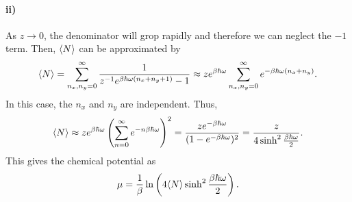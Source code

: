             \paragraph{ii)} As $z\to0$, the denominator will grop rapidly and therefore we can neglect the $-1$ term. Then, $\langle N \rangle$ can be approximated by
            \begin{equation}
                \langle N \rangle = \sum_{n_x,n_y=0}^{\infty}\frac{1}{z^{-1}e^{\beta\hbar\omega(n_x+n_y+1)}-1}\approx ze^{\beta\hbar\omega}\sum_{n_x,n_y=0}^{\infty}e^{-\beta\hbar\omega(n_x+n_y)}.
            \end{equation}
            In this case, the $n_x$ and $n_y$ are independent. Thus,
            \begin{equation}
                \langle N \rangle \approx ze^{\beta\hbar\omega}\left( \sum_{n=0}^{\infty}e^{-n\beta\hbar\omega} \right)^2=\frac{ze^{-\beta\hbar\omega}}{(1-e^{-\beta\hbar\omega})^2}=\frac{z}{4\sinh^2\frac{\beta\hbar\omega}{2}}.
            \end{equation}
            This gives the chemical potential as
            \begin{equation}
                \mu = \frac{1}{\beta}\ln\left( 4\langle N \rangle\sinh^2\frac{\beta\hbar\omega}{2} \right).
            \end{equation}
